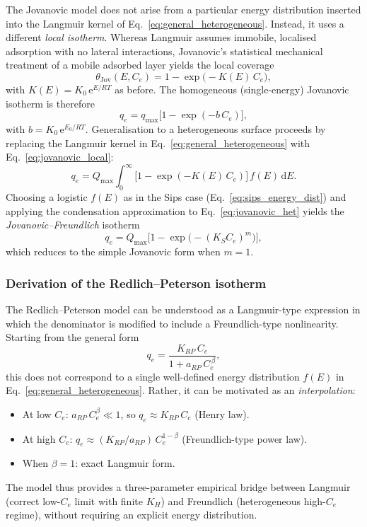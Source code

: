 \documentclass[12pt]{article}
\begin{document}
	The Jovanovic model does not arise from a particular energy
	distribution inserted into the Langmuir kernel of
	Eq.~\eqref{eq:general_heterogeneous}. Instead, it uses a different
	\emph{local isotherm}. Whereas Langmuir assumes immobile, localised
	adsorption with no lateral interactions, Jovanovic's statistical
	mechanical treatment of a mobile adsorbed layer yields the local
	coverage
	\begin{equation}
		\theta_{\mathrm{Jov}}(E, C_e)
		= 1 - \exp\!\bigl(-K(E)\,C_e\bigr),
		\label{eq:jovanovic_local}
	\end{equation}
	with $K(E) = K_0\,\mathrm{e}^{E/RT}$ as before. The homogeneous
	(single-energy) Jovanovic isotherm is therefore
	\begin{equation}
		\boxed{q_e = q_{\max}\bigl[1 - \exp(-b\,C_e)\bigr],}
	\end{equation}
	with $b = K_0\,\mathrm{e}^{E_0/RT}$. Generalisation to a
	heterogeneous surface proceeds by replacing the Langmuir kernel in
	Eq.~\eqref{eq:general_heterogeneous} with
	Eq.~\eqref{eq:jovanovic_local}:
	\begin{equation}
		q_e = Q_{\max}\int_{0}^{\infty}
		\bigl[1 - \exp(-K(E)\,C_e)\bigr]\, f(E)\,\mathrm{d}E.
		\label{eq:jovanovic_het}
	\end{equation}
	Choosing a logistic $f(E)$ as in the Sips case
	(Eq.~\eqref{eq:sips_energy_dist}) and applying the condensation
	approximation to Eq.~\eqref{eq:jovanovic_het} yields the
	\emph{Jovanovic--Freundlich} isotherm
	\begin{equation}
		q_e = Q_{\max}\bigl[1 - \exp\!\bigl(-(K_S C_e)^m\bigr)\bigr],
	\end{equation}
	which reduces to the simple Jovanovic form when $m = 1$.

	\subsubsection{Derivation of the Redlich--Peterson isotherm}

	The Redlich--Peterson model can be understood as a Langmuir-type
	expression in which the denominator is modified to include a
	Freundlich-type nonlinearity. Starting from the general form
	\begin{equation}
		q_e = \frac{K_{RP}\, C_e}{1 + a_{RP}\, C_e^{\,\beta}},
	\end{equation}
	this does not correspond to a single well-defined energy
	distribution $f(E)$ in Eq.~\eqref{eq:general_heterogeneous}.
	Rather, it can be motivated as an \emph{interpolation}:
	\begin{itemize}
		\item At low $C_e$: $a_{RP}\,C_e^{\beta} \ll 1$, so
		$q_e \approx K_{RP}\,C_e$ (Henry law).
		\item At high $C_e$: $q_e \approx (K_{RP}/a_{RP})\,
		C_e^{1-\beta}$ (Freundlich-type power law).
		\item When $\beta = 1$: exact Langmuir form.
	\end{itemize}
	The model thus provides a three-parameter empirical bridge between
	Langmuir (correct low-$C_e$ limit with finite $K_H$) and Freundlich
	(heterogeneous high-$C_e$ regime), without requiring an explicit
	energy distribution.
\end{document}
